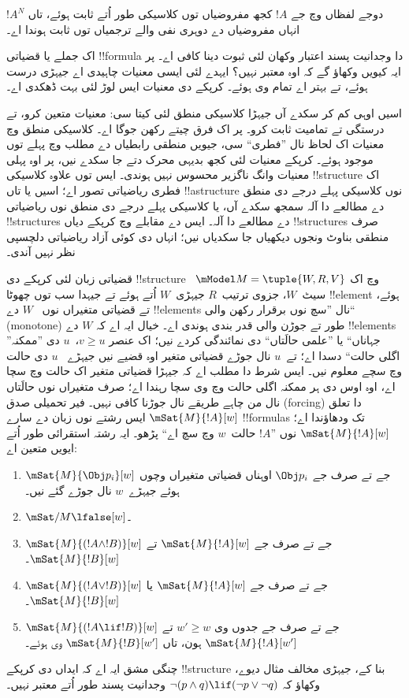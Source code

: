 \documentclass[../../../include/open-logic-section]{subfiles}
\begin{document}
دوجے لفظاں
وچ جے
$!A$ کجھ
مفروضیاں
توں کلاسیکی
طور اُتے
ثابت ہوئے،
تاں $!A^N$
انہاں مفروضیاں
دے دوہری
نفی والے
ترجمیاں
توں ثابت
ہوندا اے۔

اک جملے
یا قضیاتی
!!{formula}
دا وجدانیت
پسند اعتبار
وکھان لئی
ثبوت دینا
کافی اے۔
پر ایہ
کیویں وکھاؤ
گے کہ
اوہ معتبر
نہیں؟
ایہدے لئی
ایسی معنیات
چاہیدی اے
جیہڑی درست
ہوئے،
تے بہتر
اے تمام
وی ہوئے۔
کرپکے دی
معنیات ایس
لوڑ لئی
بہت ڈھکدی
اے۔

اسیں اوہی
کم کر
سکدے آں
جیہڑا کلاسیکی
منطق لئی
کیتا سی:
معنیات متعین
کرو، تے
درستگی تے
تمامیت ثابت
کرو۔
پر اک
فرق چیتے
رکھن جوگا
اے۔ کلاسیکی
منطق وچ
معنیات اک
لحاظ نال
”فطری“
سی، جیویں
منطقی رابطیاں
دے مطلب
وچ پہلے
توں موجود
ہوئے۔
کرپکے معنیات
لئی کجھ
بدیہی محرک
دتے جا
سکدے نیں،
پر اوہ
پہلی معنیات
وانگ ناگزیر
محسوس نہیں
ہوندی۔
ایس توں
علاوہ کلاسیکی
!!{structure}
اک فطری
ریاضیاتی تصور
اے؛ اسیں
یا تاں
!!a{structure}
نوں کلاسیکی
پہلے درجے
دی منطق
دے مطالعے
دا آلہ
سمجھ سکدے
آں، یا
کلاسیکی پہلے
درجے دی
منطق نوں
ریاضیاتی
!!{structure}s
دے مطالعے
دا آلہ۔
ایس دے
مقابلے وچ
کرپکے دیاں
!!{structure}s
صرف منطقی
بناوٹ ونجوں
دیکھیاں جا
سکدیاں
نیں؛ انہاں
دی کوئی
آزاد ریاضیاتی
دلچسپی نظر
نہیں آندی۔

قضیاتی زبان
لئی کرپکے
دی !!{structure}~
$\mModel M = \tuple{W, R, V}$
وچ اک
سیٹ~$W$،
جزوی ترتیب~$R$
جیہڑی~$W$
اُتے ہوئے
تے جیہدا
سب توں
چھوٹا !!{element}
ہوئے،
تے قضیاتی
متغیراں نوں
~$W$ دے
!!{element}s
نال ”سچ نوں برقرار رکھن والی“
(monotone) طور
تے جوڑن
والی قدر
بندی ہوندی
اے۔ خیال
ایہ اے
کہ $W$
دے !!{element}s
”جہاناں“
یا ”علمی
حالَتاں“ دی
نمائندگی کردے
نیں؛ اک
عنصر $v \geq
u$،~$u$
دی ”ممکنہ
اگلی حالت“
دسدا اے؛
تے~$u$
نال جوڑے
قضیاتی متغیر
اوہ قضیے
نیں جیہڑے
~$u$ دی
حالت وچ
سچے معلوم
نیں۔ ایس شرط دا مطلب اے کہ جیہڑا قضیاتی متغیر
اک حالت وچ سچا اے، اوہ اوس دی ہر ممکنہ اگلی
حالت وچ وی سچا رہندا اے؛ صرف متغیراں نوں
حالَتاں نال من چاہے طریقے نال جوڑنا کافی نہیں۔ فیر
تحمیلی صدق
(forcing)
دا تعلق
$\mSat{M}{!A}[w]$
ایس رشتے
نوں زبان
دے سارے
!!{formula}s
تک ودھاؤندا
اے؛
$\mSat{M}{!A}[w]$
نوں ”$!A$
حالت~$w$
وچ سچ
اے“ پڑھو۔
ایہ رشتہ
استقرائی
طور اُتے
ایویں متعین
اے:
\begin{enumerate}
\item $\mSat{M}{\Obj p_i}[w]$ جے تے صرف جے
  $\Obj p_i$ اوہناں قضیاتی متغیراں وچوں
  ہوئے جیہڑے~$w$ نال جوڑے گئے نیں۔
\item $\mSat/{M}{\lfalse}[w]$۔
\item $\mSat{M}{(!A \land !B)}[w]$ جے تے صرف جے
  $\mSat{M}{!A}[w]$ تے $\mSat{M}{!B}[w]$۔
\item $\mSat{M}{(!A \lor !B)}[w]$ جے تے صرف جے
  $\mSat{M}{!A}[w]$ یا $\mSat{M}{!B}[w]$۔
\item $\mSat{M}{(!A \lif !B)}[w]$ جے تے صرف جے
  جدوں وی $w' \geq w$ تے
  $\mSat{M}{!A}[w']$ ہون، تاں
  $\mSat{M}{!B}[w']$ وی ہوئے۔
\end{enumerate}
چنگی مشق
ایہ اے
کہ ایداں
دی کرپکے
!!{structure}
بنا کے،
جیہڑی مخالف
مثال دیوے،
وکھاؤ کہ
$\lnot (p \land q) \lif
(\lnot p \lor \lnot q)$
وجدانیت پسند
طور اُتے
معتبر نہیں۔
\end{document}
